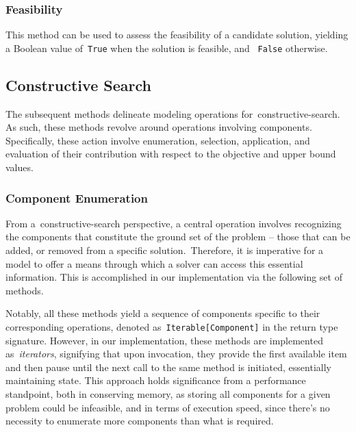 \subsubsection*{Feasibility}

\begin{center}
\end{center}

This method can be used to assess the feasibility of a candidate solution,
yielding a Boolean value of~\texttt{True} when the solution is feasible, and
~\texttt{False} otherwise.

\subsection{Constructive Search}

The subsequent methods delineate modeling operations
for~\acrshort{constructive-search}. As such, these methods revolve around
operations involving components. Specifically, these action involve enumeration,
selection, application, and evaluation of their contribution with respect to the
objective and upper bound values.

\subsubsection*{Component Enumeration}

From a~\acrshort{constructive-search} perspective, a central operation involves
recognizing the components that constitute the ground set of the problem -- those
that can be added, or removed from a specific solution.~Therefore, it is
imperative for a model to offer a means through which a solver can access this
essential information. This is accomplished in our implementation via the
following set of methods.

\begin{center}

\end{center}

Notably, all these methods yield a sequence of components specific to their
corresponding operations, denoted as~\texttt{Iterable[Component]} in the return
type signature. However, in our implementation, these methods are implemented
as~\emph{iterators}, signifying that upon invocation, they provide the first
available item and then pause until the next call to the same method is
initiated, essentially maintaining state. This approach holds significance from
a performance standpoint, both in conserving memory, as storing all components
for a given problem could be infeasible, and in terms of execution speed, since
there's no necessity to enumerate more components than what is required.

